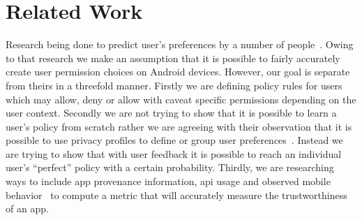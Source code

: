 \section{Related Work}
\label{RelatedWork}
Research being done to predict user's preferences by a number of people~\cite{Benisch2011,Sadeh2009,lin2014soups,liu2014www}. Owing to that research we make an assumption that it is possible to fairly accurately create user permission choices on Android devices. However, our goal is separate from theirs in a threefold manner. Firstly we are defining policy rules for users which may allow, deny or allow with caveat specific permissions depending on the user context. Secondly we are not trying to show that it is possible to learn a user's policy from scratch rather we are agreeing with their observation that it is possible to use privacy profiles to define or group user preferences~\cite{liu2014www}. Instead we are trying to show that with user feedback it is possible to reach an individual user's ``perfect'' policy with a certain probability. Thirdly, we are researching ways to include app provenance information, api usage and observed mobile behavior~\cite{enck2010taintdroid} to compute a metric that will accurately measure the trustworthiness of an app.
